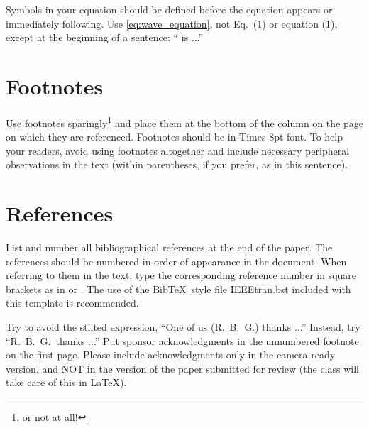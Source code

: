 \documentclass[9pt]{ieeeconf}
\begin{document}
Symbols in your equation should be defined before the equation appears or immediately following.  Use \cref{eq:wave_equation}, not Eq.~(1) or equation (1), except at the beginning of a sentence: `` is ...''


\section{Footnotes}
\label{sec:foot}

Use footnotes sparingly\footnote{or not at all!} and place them at the bottom of the column on the page on which they are referenced. Footnotes should be in Times 8pt font. To help your readers, avoid using footnotes altogether and include necessary peripheral observations in the text (within parentheses, if you prefer, as in this sentence).


\section{References}
\label{sec:ref}

List and number all bibliographical references at the end of the paper. The references should be numbered in order of appearance in the document. When referring to them in the text, type the corresponding reference number in square brackets as in \cite{cJones2026,aSmith2026} or \cite{eWilliams1999,cJones2026,aSmith2026}. The use of the Bib\TeX\ style file IEEEtran.bst included with this template is recommended.


\begin{acknowledgments}
Try to avoid the stilted expression, ``One of us (R.\ B.\ G.) thanks ...'' Instead, try ``R.\ B.\ G.\ thanks ...''  Put sponsor acknowledgments in the unnumbered footnote on the first page. Please include acknowledgments only in the camera-ready version, and NOT in the version of the paper submitted for review (the class will take care of this in \LaTeX).
\end{acknowledgments}




\end{document}

